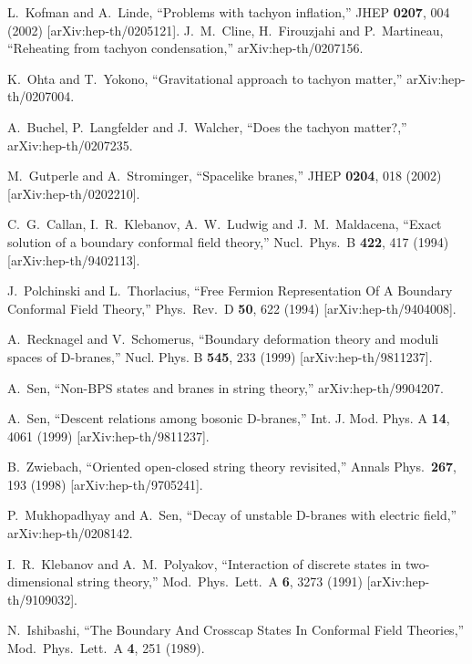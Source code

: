 \documentclass[a4paper,12pt]{article} \textheight=8.5truein
\begin{document}
\begin{thebibliography}{10}
L.~Kofman and A.~Linde, ``Problems with tachyon inflation,'' JHEP
{\bf 0207}, 004 (2002) [arXiv:hep-th/0205121].
J.~M.~Cline, H.~Firouzjahi and P.~Martineau,
``Reheating from tachyon condensation,''
arXiv:hep-th/0207156.


K.~Ohta and T.~Yokono, ``Gravitational approach to tachyon
matter,'' arXiv:hep-th/0207004.

A.~Buchel, P.~Langfelder and J.~Walcher, ``Does the tachyon
matter?,'' arXiv:hep-th/0207235.

M.~Gutperle and A.~Strominger,
``Spacelike branes,''
JHEP {\bf 0204}, 018 (2002) [arXiv:hep-th/0202210].

C.~G.~Callan, I.~R.~Klebanov, A.~W.~Ludwig and J.~M.~Maldacena,
``Exact solution of a boundary conformal field theory,'' Nucl.\
Phys.\ B {\bf 422}, 417 (1994) [arXiv:hep-th/9402113].

J.~Polchinski and L.~Thorlacius, ``Free Fermion Representation Of
A Boundary Conformal Field Theory,'' Phys.\ Rev.\ D {\bf 50}, 622
(1994) [arXiv:hep-th/9404008].

A.~Recknagel and V.~Schomerus, ``Boundary deformation theory and
moduli spaces of D-branes,'' Nucl. Phys. B {\bf 545}, 233 (1999)
[arXiv:hep-th/9811237].

A.~Sen,
``Non-BPS states and branes in string theory,''
arXiv:hep-th/9904207.

A.~Sen, ``Descent relations among bosonic D-branes,''
Int. J. Mod. Phys. A {\bf 14}, 4061 (1999)
[arXiv:hep-th/9811237].

B.~Zwiebach, ``Oriented open-closed string theory revisited,''
Annals Phys.\  {\bf 267}, 193 (1998) [arXiv:hep-th/9705241].

P.~Mukhopadhyay and A.~Sen, ``Decay of unstable D-branes with
electric field,'' arXiv:hep-th/0208142.

I.~R.~Klebanov and A.~M.~Polyakov, ``Interaction of discrete
states in two-dimensional string theory,'' Mod.\ Phys.\ Lett.\ A
{\bf 6}, 3273 (1991) [arXiv:hep-th/9109032].

N.~Ishibashi, ``The Boundary And Crosscap States In Conformal
Field Theories,'' Mod.\ Phys.\ Lett.\ A {\bf 4}, 251 (1989).

\end{thebibliography}\endgroup
\end{document}
